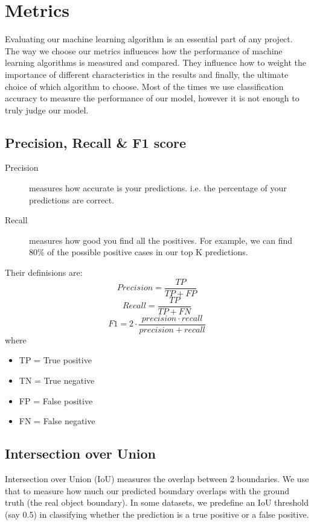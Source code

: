 \documentclass{article}
\begin{document}
\section{Metrics}
Evaluating our machine learning algorithm is an essential part of any project. The way we choose our metrics influences how the performance of machine learning algorithms is measured and compared.
They influence how to weight the importance of different characteristics in the results and finally, the ultimate choice of which algorithm to choose. Most of the times we use classification accuracy
to measure the performance of our model, however it is not enough to truly judge our model.

\subsection{Precision, Recall \& F1 score}

\begin{description}
\item[ Precision ]  measures how accurate is your predictions. i.e. the percentage of your predictions are correct.
\item[ Recall ] measures how good you find all the positives. For example, we can find 80\% of the possible positive cases in our top K predictions.
\end{description}
Their definisions are:
\[ Precision = \frac{TP}{TP + FP} \]  
\[  Recall = \frac{TP}{TP + FN} \] 
\[ F1 = 2 \cdot \frac{precision \cdot recall}{precision + recall} \]
where \begin{itemize}
\item TP = True positive
\item TN = True negative
\item FP = False positive
\item FN = False negative
\end{itemize}

\subsection{Intersection over Union}

Intersection over Union (IoU)  measures the overlap between 2 boundaries. We use that to measure how much our predicted boundary overlaps with the ground truth (the real object boundary).
In some datasets, we predefine an IoU threshold (say 0.5) in classifying whether the prediction is a true positive or a false positive.
\end{document}
